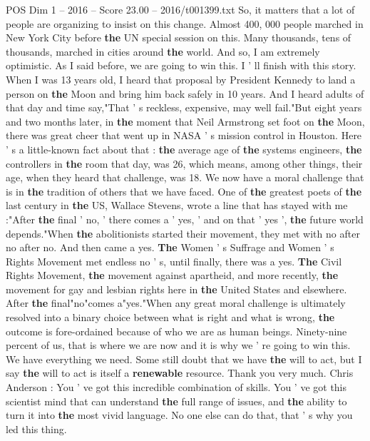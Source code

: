 \begin{textsample}{POS Dim 1 – 2016 – Score 23.00 – 2016/t001399.txt}
So, it matters that a lot of people are organizing to insist on this change.
Almost 400, 000 people marched in New York City before \textbf{the} UN special session on this.
Many thousands, tens of thousands, marched in cities around \textbf{the} world.
And so, I am extremely optimistic.
As I said before, we are going to win this.
I ' ll finish with this story.
When I was 13 years old, I heard that proposal by President Kennedy to land a person on \textbf{the} Moon and bring him back safely in 10 years.
And I heard adults of that day and time say,"That ' s reckless, expensive, may well fail."But eight years and two months later, in \textbf{the} moment that Neil Armstrong set foot on \textbf{the} Moon, there was great cheer that went up in NASA ' s mission control in Houston.
Here ' s a little-known fact about that : \textbf{the} average age of \textbf{the} systems engineers, \textbf{the} controllers in \textbf{the} room that day, was 26, which means, among other things, their age, when they heard that challenge, was 18.
We now have a moral challenge that is in \textbf{the} tradition of others that we have faced.
One of \textbf{the} greatest poets of \textbf{the} last century in \textbf{the} US, Wallace Stevens, wrote a line that has stayed with me :"After \textbf{the} final ' no, ' there comes a ' yes, ' and on that ' yes ', \textbf{the} future world depends."When \textbf{the} abolitionists started their movement, they met with no after no after no.
And then came a yes. \textbf{The} Women ' s Suffrage and Women ' s Rights Movement met endless no ' s, until finally, there was a yes. \textbf{The} Civil Rights Movement, \textbf{the} movement against apartheid, and more recently, \textbf{the} movement for gay and lesbian rights here in \textbf{the} United States and elsewhere.
After \textbf{the} final"no"comes a"yes."When any great moral challenge is ultimately resolved into a binary choice between what is right and what is wrong, \textbf{the} outcome is fore-ordained because of who we are as human beings.
Ninety-nine percent of us, that is where we are now and it is why we ' re going to win this.
We have everything we need.
Some still doubt that we have \textbf{the} will to act, but I say \textbf{the} will to act is itself a \textbf{renewable} resource.
Thank you very much.
Chris Anderson : You ' ve got this incredible combination of skills.
You ' ve got this scientist mind that can understand \textbf{the} full range of issues, and \textbf{the} ability to turn it into \textbf{the} most vivid language.
No one else can do that, that ' s why you led this thing.

\end{textsample}
